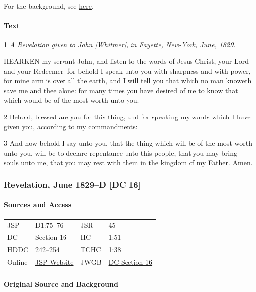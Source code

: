 				For the background, see \hyperref[DC15-HB]{here}.
			
			\paragraph{Text}
			
				1 \textit{A Revelation given to John [Whitmer], in Fayette, New-York, June, 1829.}

				HEARKEN my servant John, and listen to the words of Jesus Christ, your Lord and your Redeemer, for behold I speak unto you with sharpness and with power, for mine arm is over all the earth, and I will tell you that which no man knoweth save me and thee alone: for many times you have desired of me to know that which would be of the most worth unto you.

				2 Behold, blessed are you for this thing, and for speaking my words which I have given you, according to my commandments:

				3 And now behold I say unto you, that the thing which will be of the most worth unto you, will be to declare repentance unto this people, that you may bring souls unto me, that you may rest with them in the kingdom of my Father. Amen. 
			
		\subsubsection{Revelation, June 1829--D [DC 16]}
			\label{EMS-1828-1829-JS-JUN-1829-D}
			
			\paragraph{Sources and Access}

				\begin{tabular}{p{1in}p{1.5in}p{1in}p{1.5in}}
				JSP	 	& D1:75--76		& JSR 		& 45		 \\  
				DC	 	& Section 16 	& HC 		& 1:51		 \\
				HDDC 	& 242--254 		& TCHC 		& 1:38		 \\
				Online  & \href{https://www.josephsmithpapers.org/paper-summary/revelation-june-1829-d-dc-16/1}{JSP Website} & 
				JWGB	& \hyperref[DC16]{DC Section 16} \\
				\end{tabular}
			
			\paragraph{Original Source and Background}
			
